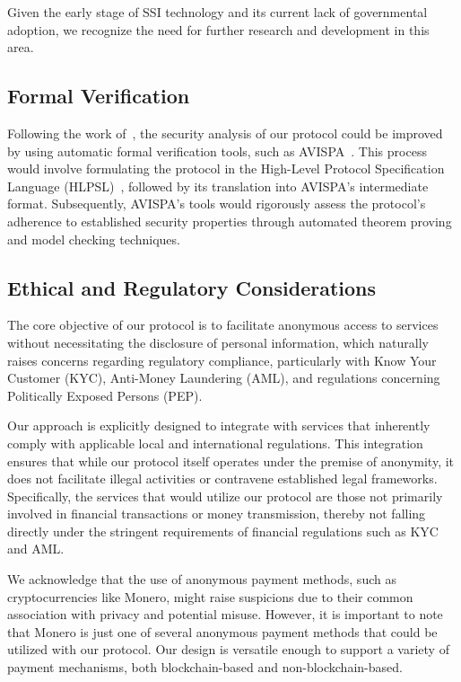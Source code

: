 \documentclass[pdftex,twocolumn,epjc3]{svjour3}
\begin{document}
Given the early stage of SSI technology and its current lack of governmental adoption, we recognize the need for further research and development in this area.

\subsection{Formal Verification}\label{sec:formal-verification}
Following the work of~\cite{birjoveanuFormalVerificationMultiparty2022}, the security analysis of our protocol could be improved by using automatic formal verification tools, such as AVISPA~\cite{armandoAVISPAToolAutomated2005}. This process would involve formulating the protocol in the High-Level Protocol Specification Language (HLPSL)~\cite{chevalierHighLevelProtocol2004}, followed by its translation into AVISPA's intermediate format. Subsequently, AVISPA's tools would rigorously assess the protocol's adherence to established security properties through automated theorem proving and model checking techniques.


\subsection{Ethical and Regulatory Considerations}

The core objective of our protocol is to facilitate anonymous access to services without necessitating the disclosure of personal information, which naturally raises concerns regarding regulatory compliance, particularly with Know Your Customer (KYC), Anti-Money Laundering (AML), and regulations concerning Politically Exposed Persons (PEP).

Our approach is explicitly designed to integrate with services that inherently comply with applicable local and international regulations. This integration ensures that while our protocol itself operates under the premise of anonymity, it does not facilitate illegal activities or contravene established legal frameworks. Specifically, the services that would utilize our protocol are those not primarily involved in financial transactions or money transmission, thereby not falling directly under the stringent requirements of financial regulations such as KYC and AML.

We acknowledge that the use of anonymous payment methods, such as cryptocurrencies like Monero, might raise suspicions due to their common association with privacy and potential misuse. However, it is important to note that Monero is just one of several anonymous payment methods that could be utilized with our protocol. Our design is versatile enough to support a variety of payment mechanisms, both blockchain-based and non-blockchain-based.
\end{document}

